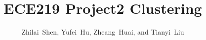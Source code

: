 \documentclass[runningheads]{llncs}
\begin{document}
%
\title{ECE219 Project2 Clustering}
%
%
\author{Zhilai~Shen, Yufei~Hu, Zheang~Huai, and Tianyi~Liu
}
%
%
%
\maketitle              %
%
%
%
%

\end{document}
